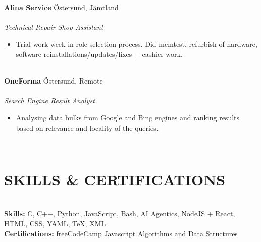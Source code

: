 \documentclass[10pt, a4paper]{article}
\begin{document}
\texttt{}\\[-0.2cm]
\textbf{Alina Service} \hfill Östersund, Jämtland\\
\noindent{}\\
\textit{Technical Repair Shop Assistant}\\
\begin{itemize}[leftmargin=0.3cm, itemsep=0.1cm]
\item Trial work week in role selection process. Did memtest, refurbish of hardware, software reinstallations/updates/fixes + cashier work. 
\end{itemize}
\texttt{}\\[-0.2cm]
\textbf{OneForma} \hfill Östersund, Remote\\
\noindent{}\\
\textit{Search Engine Result Analyst}\\
\begin{itemize}[leftmargin=0.3cm, itemsep=0.1cm]
\item Analysing data bulks from Google and Bing engines and ranking results based on relevance and locality of the queries. 
\end{itemize}
\texttt{}\\[-0.5cm]
\section*{SKILLS \& CERTIFICATIONS}
\texttt{}\\[-0.5cm]
\textbf{Skills:} C, C++, Python, JavaScript, Bash, AI Agentics, NodeJS + React, HTML, CSS, YAML, TeX, XML\\
\textbf{Certifications:} freeCodeCamp Javascript Algorithms and Data Structures
\end{document}
